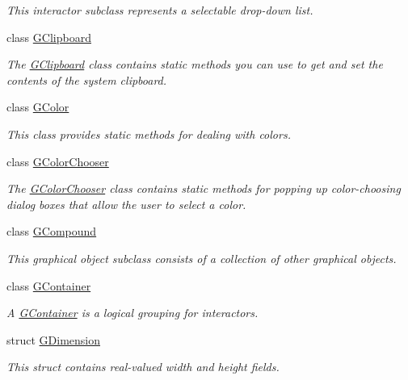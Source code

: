 \begin{DoxyCompactItemize}
\begin{DoxyCompactList}\small\item\em This interactor subclass represents a selectable drop-\/down list. \end{DoxyCompactList}\item 
class \mbox{\hyperlink{classsgl_1_1GClipboard}{G\+Clipboard}}
\begin{DoxyCompactList}\small\item\em The \mbox{\hyperlink{classsgl_1_1GClipboard}{G\+Clipboard}} class contains static methods you can use to get and set the contents of the system clipboard. \end{DoxyCompactList}\item 
class \mbox{\hyperlink{classsgl_1_1GColor}{G\+Color}}
\begin{DoxyCompactList}\small\item\em This class provides static methods for dealing with colors. \end{DoxyCompactList}\item 
class \mbox{\hyperlink{classsgl_1_1GColorChooser}{G\+Color\+Chooser}}
\begin{DoxyCompactList}\small\item\em The \mbox{\hyperlink{classsgl_1_1GColorChooser}{G\+Color\+Chooser}} class contains static methods for popping up color-\/choosing dialog boxes that allow the user to select a color. \end{DoxyCompactList}\item 
class \mbox{\hyperlink{classsgl_1_1GCompound}{G\+Compound}}
\begin{DoxyCompactList}\small\item\em This graphical object subclass consists of a collection of other graphical objects. \end{DoxyCompactList}\item 
class \mbox{\hyperlink{classsgl_1_1GContainer}{G\+Container}}
\begin{DoxyCompactList}\small\item\em A \mbox{\hyperlink{classsgl_1_1GContainer}{G\+Container}} is a logical grouping for interactors. \end{DoxyCompactList}\item 
struct \mbox{\hyperlink{structsgl_1_1GDimension}{G\+Dimension}}
\begin{DoxyCompactList}\small\item\em This struct contains real-\/valued width and height fields. \end{DoxyCompactList}\item 

\end{DoxyCompactItemize}
